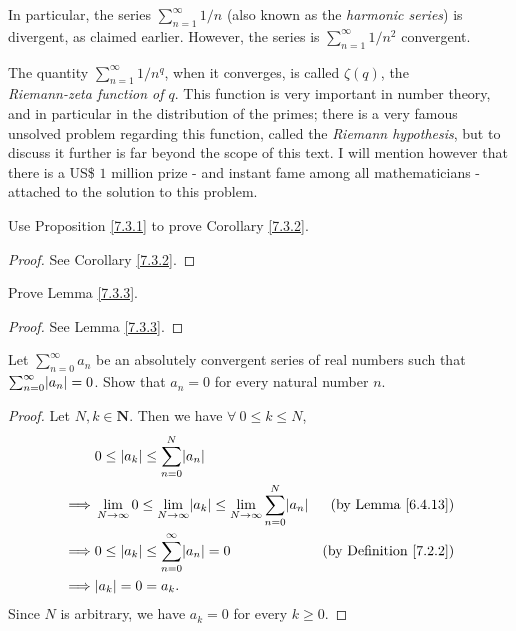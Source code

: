 \begin{note}
    In particular, the series \(\sum_{n = 1}^\infty 1 / n\) (also known as the \emph{harmonic series}) is divergent, as claimed earlier.
    However, the series is \(\sum_{n = 1}^\infty 1 / n^2\) convergent.
\end{note}

\begin{remark}\label{7.3.8}
    The quantity \(\sum_{n = 1}^\infty 1 / n^q\), when it converges, is called \(\zeta(q)\), the \\
    \emph{Riemann-zeta function of \(q\)}.
    This function is very important in number theory, and in particular in the distribution of the primes;
    there is a very famous unsolved problem regarding this function, called the \emph{Riemann hypothesis}, but to discuss it further is far beyond the scope of this text.
    I will mention however that there is a US\$ \(1\) million prize
    - and instant fame among all mathematicians -
    attached to the solution to this problem.
\end{remark}

\exercisesection

\begin{exercise}\label{ex 7.3.1}
    Use Proposition \ref{7.3.1} to prove Corollary \ref{7.3.2}.
\end{exercise}

\begin{proof}
    See Corollary \ref{7.3.2}.
\end{proof}

\begin{exercise}\label{ex 7.3.2}
    Prove Lemma \ref{7.3.3}.
\end{exercise}

\begin{proof}
    See Lemma \ref{7.3.3}.
\end{proof}

\begin{exercise}\label{ex 7.3.3}
    Let \(\sum_{n = 0}^\infty a_n\) be an absolutely convergent series of real numbers such that \(\sum_{n = 0}^\infty \abs*{a_n} = 0\).
    Show that \(a_n = 0\) for every natural number \(n\).
\end{exercise}

\begin{proof}
    Let \(N, k \in \mathbf{N}\).
    Then we have \(\forall\ 0 \leq k \leq N\),
    \begin{align*}
                 & 0 \leq \abs*{a_k} \leq \sum_{n = 0}^N \abs*{a_n}                                                                                                  \\
        \implies & \lim_{N \to \infty} 0 \leq \lim_{N \to \infty} \abs*{a_k} \leq \lim_{N \to \infty} \sum_{n = 0}^N \abs*{a_n} & \text{(by Lemma \ref{6.4.13})}     \\
        \implies & 0 \leq \abs*{a_k} \leq \sum_{n = 0}^\infty \abs*{a_n} = 0                                                    & \text{(by Definition \ref{7.2.2})} \\
        \implies & \abs*{a_k} = 0 = a_k.
    \end{align*}
    Since \(N\) is arbitrary, we have \(a_k = 0\) for every \(k \geq 0\).
\end{proof}